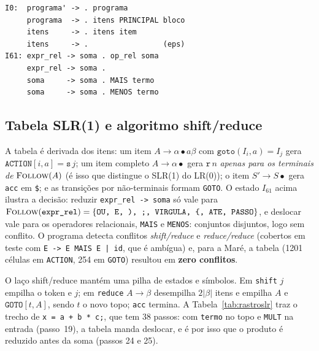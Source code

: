 \documentclass[conference]{IEEEtran}
\begin{document}
\begin{lstlisting}[style=ebnf,caption={Estados $I_0$ e $I_{61}$ (\texttt{-{}-itens-lr0}).},label=lst:itens]
I0:  programa' -> . programa
     programa  -> . itens PRINCIPAL bloco
     itens     -> . itens item
     itens     -> .                 (eps)
I61: expr_rel -> soma . op_rel soma
     expr_rel -> soma .
     soma     -> soma . MAIS termo
     soma     -> soma . MENOS termo
\end{lstlisting}

\subsection{Tabela SLR(1) e algoritmo shift/reduce}\label{sec:slr}
A tabela é derivada dos itens: um item $A\to\alpha\bullet a\beta$ com
$\texttt{goto}(I_i,a)=I_j$ gera $\texttt{ACTION}[i,a]=\texttt{s}\,j$; um item
completo $A\to\alpha\bullet$ gera $\texttt{r}\,n$ \emph{apenas para os terminais
de} $\textsc{Follow}(A)$ (é isso que distingue o SLR(1) do LR(0)); o item
$S'\to S\bullet$ gera \texttt{acc} em \texttt{\$}; e as transições por
não-terminais formam \texttt{GOTO}. O estado $I_{61}$ acima ilustra a decisão:
reduzir \texttt{expr\_rel -> soma} só vale para
$\textsc{Follow}(\texttt{expr\_rel})=\{\texttt{OU, E, ), ;, VIRGULA, \{, ATE, PASSO}\}$, e deslocar vale para
os operadores relacionais, \texttt{MAIS} e \texttt{MENOS}: conjuntos
disjuntos, logo sem conflito. O programa detecta conflitos
\emph{shift/reduce} e \emph{reduce/reduce} (cobertos em teste com
\texttt{E -> E MAIS E | id}, que é ambígua) e, para a Maré, a tabela
(1201 células em \texttt{ACTION}, 254 em \texttt{GOTO}) resultou em
\textbf{zero conflitos}.

O laço shift/reduce mantém uma pilha de estados e símbolos. Em
\texttt{shift} $j$ empilha o token e $j$; em \texttt{reduce} $A\to\beta$
desempilha $2|\beta|$ itens e empilha $A$ e $\texttt{GOTO}[t,A]$, sendo $t$ o
novo topo; \texttt{acc} termina. A Tabela~\ref{tab:rastroslr} traz o trecho
de \texttt{x = a + b * c;}, que tem 38 passos: com \texttt{termo} no topo e
\texttt{MULT} na entrada (passo~19), a tabela manda deslocar, e é por isso que
o produto é reduzido antes da soma (passos 24 e 25).
\end{document}
